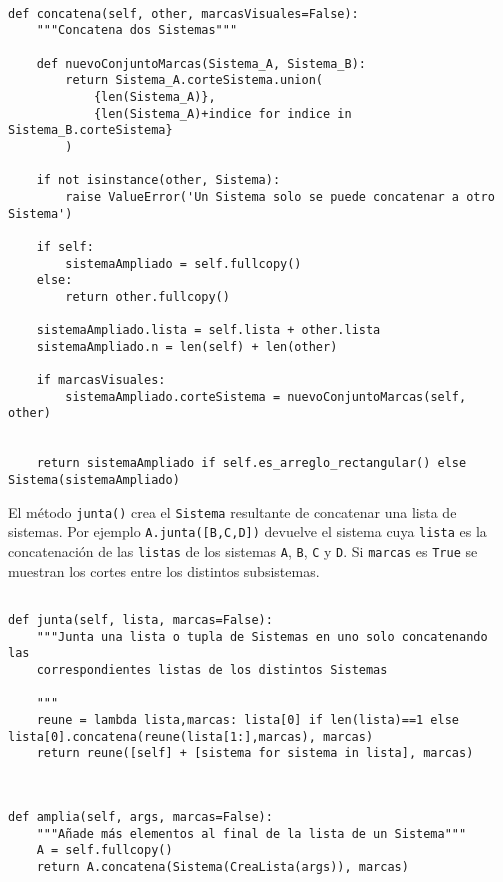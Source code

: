 \documentclass[11pt]{report}
\begin{document}
\begin{verbatim}

def concatena(self, other, marcasVisuales=False):
    """Concatena dos Sistemas"""
    
    def nuevoConjuntoMarcas(Sistema_A, Sistema_B):
        return Sistema_A.corteSistema.union(
            {len(Sistema_A)},
            {len(Sistema_A)+indice for indice in Sistema_B.corteSistema}
        )
    
    if not isinstance(other, Sistema):
        raise ValueError('Un Sistema solo se puede concatenar a otro Sistema')

    if self:
        sistemaAmpliado = self.fullcopy()
    else:
        return other.fullcopy()
        
    sistemaAmpliado.lista = self.lista + other.lista
    sistemaAmpliado.n = len(self) + len(other)
        
    if marcasVisuales: 
        sistemaAmpliado.corteSistema = nuevoConjuntoMarcas(self, other)
        

    return sistemaAmpliado if self.es_arreglo_rectangular() else Sistema(sistemaAmpliado)

\end{verbatim}

El método \texttt{junta()} crea el \texttt{Sistema} resultante de concatenar una
lista de sistemas. Por ejemplo \texttt{A.junta([B,C,D])} devuelve el sistema
cuya \texttt{lista} es la concatenación de las \texttt{listas} de los sistemas \texttt{A},
\texttt{B}, \texttt{C} y \texttt{D}. Si \texttt{marcas} es \texttt{True} se muestran los cortes entre los
distintos subsistemas.
\begin{verbatim}

def junta(self, lista, marcas=False):
    """Junta una lista o tupla de Sistemas en uno solo concatenando las
    correspondientes listas de los distintos Sistemas

    """
    reune = lambda lista,marcas: lista[0] if len(lista)==1 else lista[0].concatena(reune(lista[1:],marcas), marcas)    
    return reune([self] + [sistema for sistema in lista], marcas)
    
\end{verbatim}

\begin{verbatim}

def amplia(self, args, marcas=False):
    """Añade más elementos al final de la lista de un Sistema"""
    A = self.fullcopy()
    return A.concatena(Sistema(CreaLista(args)), marcas)

\end{verbatim}
\end{document}

